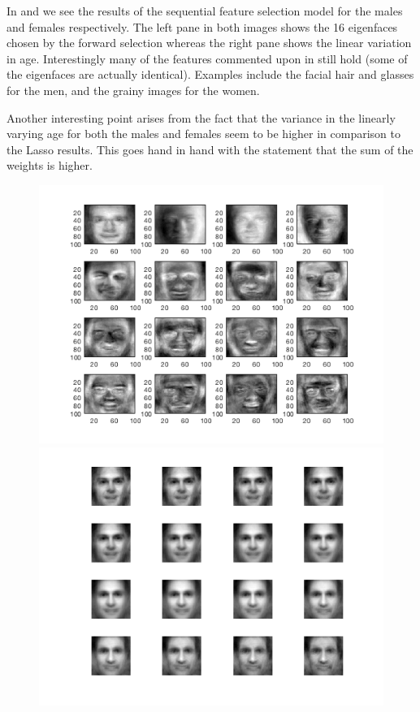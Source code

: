 In  and  we see the results of the sequential feature selection model for the males and females respectively. The left pane in both images shows the 16 eigenfaces chosen by the forward selection whereas the right pane shows the linear variation in age. Interestingly many of the features commented upon in  still hold (some of the eigenfaces are actually identical). Examples include the facial hair and glasses for the men, and the grainy images for the women.

Another interesting point arises from the fact that the variance in the linearly varying age for both the males and females seem to be higher in comparison to the Lasso results. This goes hand in hand with the statement that the sum of the weights is higher.

\begin{figure}[ht!]
    \centering
    \begin{minipage}{0.49\textwidth}
    \includegraphics[width=1\linewidth]{fig/M_fs.png}
    \end{minipage}
    \begin{minipage}{0.49\textwidth}
    \includegraphics[width=1\linewidth]{fig/M_fs_Age.png}

\end{minipage}
\end{figure}

